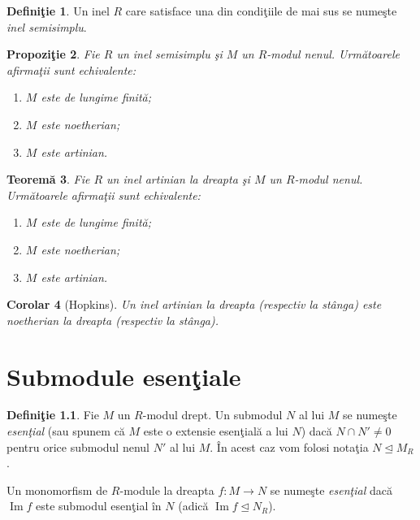 \documentclass[12pt,a4paper]{book}
\newcommand{\ess}{\trianglelefteq}  %
\theoremstyle{plain}
\newtheorem{theorem}{Teoremă}[section] %
\newtheorem{proposition}[theorem]{Propoziţie}
\newtheorem{corollary}[theorem]{Corolar}
\theoremstyle{definition}
\newtheorem{definition}[theorem]{Definiţie}
\theoremstyle{remark}
\begin{document}
\begin{definition}
Un inel \(R\) care satisface una din condiţiile de mai sus se numeşte
\emph{inel semisimplu}.
\end{definition}

\begin{proposition}
Fie \(R\) un inel semisimplu şi \(M\) un \(R\)-modul nenul.
Următoarele afirmaţii sunt echivalente:
\begin{enumerate}
  \item \(M\) este de lungime finită;
  \item \(M\) este noetherian;
  \item \(M\) este artinian.
\end{enumerate}
\end{proposition}

\begin{theorem}
Fie \(R\) un inel artinian la dreapta şi \(M\) un \(R\)-modul nenul.
Următoarele afirmaţii sunt echivalente:
\begin{enumerate}
  \item \(M\) este de lungime finită;
  \item \(M\) este noetherian;
  \item \(M\) este artinian.
\end{enumerate}
\end{theorem}

\begin{corollary}[Hopkins]
Un inel artinian la dreapta (respectiv la stânga) este noetherian la
dreapta (respectiv la stânga).
\end{corollary}






\chapter{Submodule esenţiale}

\begin{definition}\label{def:submodul-esential}
Fie \(M\) un \(R\)-modul drept. Un submodul \(N\) al lui \(M\) se numeşte
\emph{esenţial} (sau spunem că \(M\) este o extensie esenţială a lui \(N\))
dacă \(N \cap N' \neq 0\) pentru orice submodul nenul \(N'\) al lui \(M\).
În acest caz vom folosi notaţia \(N \ess M_R\).

Un monomorfism de \(R\)-module la dreapta \(f : M \to N\) se numeşte
\emph{esenţial} dacă \(\operatorname{Im} f\) este submodul esenţial în
\(N\) (adică \(\operatorname{Im} f \ess N_R\)).
\end{definition}
\end{document}
